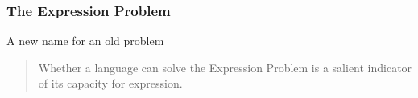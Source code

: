 \begin{frame}
\frametitle{The Expression Problem}
\begin{block}{A new name for an old problem\cite{wadler1998expression}}
\begin{quote}
Whether a language can solve the Expression Problem is a salient
indicator of its capacity for expression.
\end{quote}
\end{block}
\end{frame}
